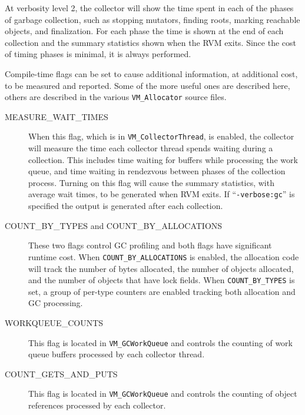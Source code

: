 At verbosity level 2, the collector will show the time spent in each
of the phases of garbage collection, such as stopping mutators,
finding roots, marking reachable objects, and finalization.  For each
phase the time is shown at the end of each collection and the summary
statistics shown when the RVM exits.  Since the cost of timing phases
is minimal, it is always performed.

Compile-time flags can be set to cause additional information, at additional
cost, to be measured and reported.  Some of the more useful ones are
described here, others are described in the various {\tt VM\_Allocator}
source files.

\begin{description}
\item[MEASURE\_WAIT\_TIMES]
When this flag, which is in {\tt VM\_CollectorThread}, is enabled, 
the collector will measure the time each collector thread
spends waiting during a collection.  This includes time waiting for buffers while
processing the work queue, and time waiting in rendezvous between phases of the
collection process. Turning on this flag will cause
the summary statistics, with average wait times, to be generated when RVM exits.  
If ``{\tt -verbose:gc}'' is specified the output is generated after each collection.

\item[COUNT\_BY\_TYPES and COUNT\_BY\_ALLOCATIONS]
These two flags control GC profiling and both flags have significant runtime cost.
When {\tt COUNT\_BY\_ALLOCATIONS} is enabled, the allocation code will track the number
of bytes allocated, the number of objects allocated, and the number of objects that have
lock fields.  When {\tt COUNT\_BY\_TYPES} is set, a group of per-type counters are enabled
tracking both allocation and GC processing.

\item[WORKQUEUE\_COUNTS]
This flag is located in {\tt VM\_GCWorkQueue} and controls the counting of work queue buffers
processed by each collector thread.

\item[COUNT\_GETS\_AND\_PUTS]
This flag is located in {\tt VM\_GCWorkQueue} and controls the counting of object references 
processed by each collector.

\end{description}

